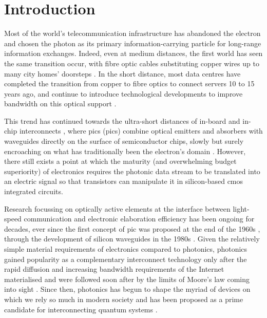\chapter{Introduction}
\label{chap:introduction}

Most of the world's telecommunication infrastructure has abandoned the electron and chosen the photon as its primary information-carrying particle for long-range information exchanges. Indeed, even at medium distances, the first world has seen the same transition occur, with fibre optic cables substituting copper wires up to many city homes' doorsteps \cite{ECBroadband, ETNOBroadband}. In the short distance, most data centres have completed the transition from copper to fibre optics to connect servers \num{10} to \num{15} years ago, and continue to introduce technological developments to improve bandwidth on this optical support \cite{Cheng2018}. 

This trend has continued towards the ultra-short distances of in-board and in-chip interconnects \cite{Benner2005}, where \acl{pic}s (\acs{pic}s) combine optical emitters and absorbers with waveguides directly on the surface of semiconductor chips, slowly but surely encroaching on what has traditionally been the electron's domain \cite{Shekhar2024, Margalit2021, Smit2019}. However, there still exists a point at which the maturity (and overwhelming budget superiority) of electronics requires the photonic data stream to be translated into an electric signal so that transistors can manipulate it in silicon-based \acf{cmos} integrated circuits. 

Research focussing on optically active elements at the interface between light-speed communication and electronic elaboration efficiency has been ongoing for decades, ever since the first concept of \acs{pic} was proposed at the end of the 1960s \cite{Miller1969}, through the development of silicon waveguides in the 1980s \cite{Soref1987}. Given the relatively simple material requirements of electronics compared to photonics, photonics gained popularity as a complementary interconnect technology only after the rapid diffusion and increasing bandwidth requirements of the Internet materialised and were followed soon after by the limits of Moore's law coming into sight \cite{Pathak2019}. Since then, photonics has begun to shape the myriad of devices on which we rely so much in modern society and has been proposed as a prime candidate for interconnecting quantum systems \cite{Luo2023}.


